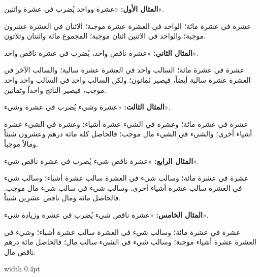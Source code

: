 \documentclass[11pt,a4paper,openany,oneside]{book}
\begin{document}
\noindent\begin{minipage}[t]{0.48\textwidth}
\raggedleft

\begin{Arabic}
\textbf{المثال الأول:} «عشرة وواحد يُضرب في عشرة واثنين».

عشرة في عشرة مائة؛ الواحد في العشرة عشرة موجبة؛ الاثنان في العشرة عشرون موجبة؛ والواحد في الاثنين اثنان موجبة؛ المجموع مائة واثنتان وثلاثون.

\textbf{المثال الثاني:} «عشرة ناقص واحد، يُضرب في عشرة ناقص واحد».

عشرة في عشرة مائة؛ السالب واحد في العشرة عشرة سالبة؛ والسالب الآخر في العشرة عشرة سالبة أيضاً، فيصير ثمانون؛ ولكن السالب واحد في السالب واحد واحد موجب، فيصير الناتج واحداً وثمانين.

\textbf{المثال الثالث:} «عشرة وشيء يُضرب في عشرة وشيء».

عشرة في عشرة مائة؛ وعشرة في الشيء عشرة أشياء؛ وعشرة في الشيء عشرة أشياء أخرى؛ والشيء في الشيء مال موجب؛ فالحاصل كله مائة درهم وعشرون شيئاً ومالاً موجباً.

\textbf{المثال الرابع:} «عشرة ناقص شيء يُضرب في عشرة ناقص شيء».

عشرة في عشرة مائة؛ وسالب شيء في العشرة سالب عشرة أشياء؛ وسالب شيء في العشرة سالب عشرة أشياء أخرى. وسالب شيء في سالب شيء مال موجب. فالحاصل مائة ومال ناقص عشرين شيئاً.

\textbf{المثال الخامس:} «عشرة ناقص شيء يُضرب في عشرة وزيادة شيء».

عشرة في عشرة مائة؛ وسالب شيء في العشرة سالب عشرة أشياء؛ وشيء في العشرة عشرة أشياء موجبة؛ وسالب شيء في الشيء سالب مال؛ فالحاصل مائة درهم ناقص مال.
\end{Arabic}

\end{minipage}%
\hfill\vrule width 0.4pt\hfill
\end{document}
